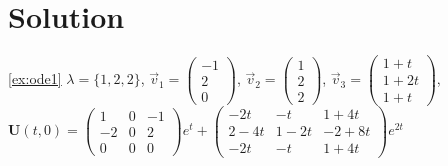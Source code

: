 \documentclass[a4paper,10pt]{book}
\begin{document}
\section{Solution}

\ref{ex:ode1} $\lambda=\{1,2,2\}$, 
              $\vec{v}_1=\left(\begin{smallmatrix} -1\\ 2 \\ 0 \end{smallmatrix} \right)$, 
              $\vec{v}_2=\left(\begin{smallmatrix} 1\\ 2 \\ 2 \end{smallmatrix} \right)$, 
              $\vec{v}_3=\left(\begin{smallmatrix} 1+t\\ 1+2t \\ 1+t \end{smallmatrix} \right)$,\\
              \hphantom{\ref{ex:ode1}} $\mathbf{U}(t,0)=\left(\begin{smallmatrix} 1 & 0 & -1\\ -2 & 0 & 2 \\ 0 & 0 & 0 \end{smallmatrix} \right)e^{t}
               +\left(\begin{smallmatrix} -2t & -t & 1+4t\\ 2-4t & 1-2t & -2+8t \\ -2t & -t & 1+4t \end{smallmatrix} \right)e^{2t}$
               
\end{document}
